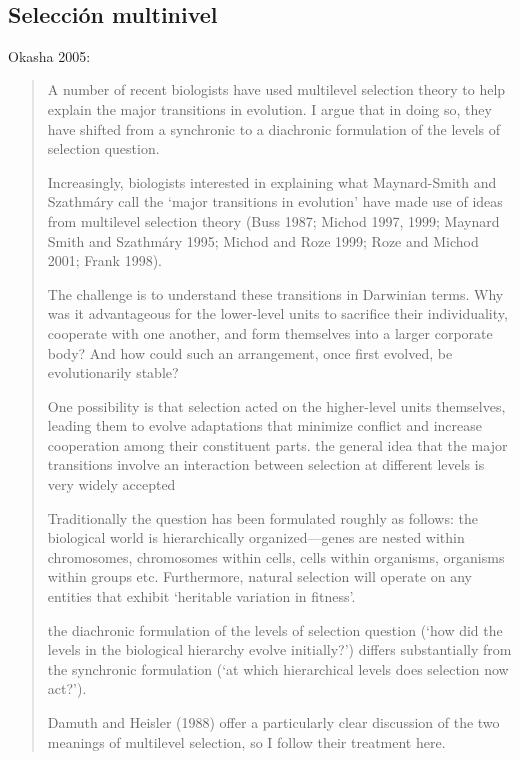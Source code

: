 \documentclass[a4paper,10pt]{article}
\begin{document}
\\


\subsection{Selección multinivel}


Okasha 2005:
\begin{quotation} \cite{okasha2005-multilevelTransitions}   
    A number of recent biologists have used multilevel selection theory to help explain the major transitions in evolution.
    I argue that in doing so, they have shifted from a synchronic to a diachronic formulation of the levels of selection question.
    
    Increasingly, biologists interested in explaining what Maynard-Smith and Szathmáry call the ‘major transitions in evolution’ have made use of ideas from multilevel selection theory (Buss 1987; Michod 1997, 1999; Maynard Smith and Szathmáry 1995; Michod and Roze 1999; Roze and Michod 2001; Frank 1998).
    
    The challenge is to understand these transitions in Darwinian terms.
    Why was it advantageous for the lower-level units to sacrifice their individuality, cooperate with one another, and form themselves into a larger corporate body?
    And how could such an arrangement, once first evolved, be evolutionarily stable?
    
    One possibility is that selection acted on the higher-level units themselves, leading them to evolve adaptations that minimize conflict and increase cooperation among their constituent parts.
    the general idea that the major transitions involve an interaction between selection at different levels is very widely accepted
    
    Traditionally the question has been formulated roughly as follows: the biological world is hierarchically organized—genes are nested within chromosomes, chromosomes within cells, cells within organisms, organisms within groups etc. Furthermore, natural selection will operate on any entities that exhibit ‘heritable variation in fitness’.
    
    the diachronic formulation of the levels of selection question (‘how did the levels in the biological hierarchy evolve initially?’) differs substantially from the synchronic formulation (‘at which hierarchical levels does selection now act?’).

    Damuth and Heisler (1988) offer a particularly clear discussion of the two meanings of multilevel selection, so I follow their treatment here.
    

\end{quotation}
\end{document}

